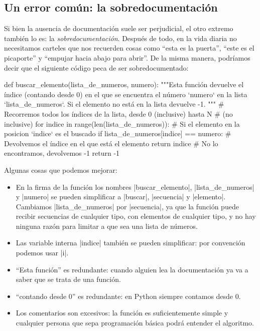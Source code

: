 \subsection{Un error común: la sobredocumentación}

Si bien la ausencia de documentación suele ser perjudicial, el otro extremo
también lo es: la \emph{sobredocumentación}. Después de todo, en la vida
diaria no necesitamos carteles que nos recuerden cosas como ``esta es la
puerta'', ``este es el picaporte'' y ``empujar hacia abajo para abrir''. De
la misma manera, podríamos decir que el siguiente código peca de ser sobredocumentado:

\begin{codigo-python-sn}
def buscar_elemento(lista_de_numeros, numero):
    """Esta función devuelve el índice (contando desde 0) en el que se
       encuentra el número `numero` en la lista `lista_de_numeros`.
       Si el elemento no está en la lista devuelve -1.
    """
    # Recorremos todos los índices de la lista, desde 0 (inclusive) hasta N
    # (no inclusive)
    for indice in range(len(lista_de_numeros)):
        # Si el elemento en la posicion `indice` es el buscado
        if lista_de_numeros[indice] == numero:
            # Devolvemos el índice en el que está el elemento
            return indice
    # No lo encontramos, devolvemos -1
    return -1
\end{codigo-python-sn}

Algunas cosas que podemos mejorar:

\begin{itemize}
\item En la firma de la función los nombres |buscar_elemento|,
    |lista_de_numeros| y |numero| se pueden simplificar a |buscar|, |secuencia| y
    |elemento|. Cambiamos |lista_de_numeros| por |secuencia|, ya que la función
    puede recibir secuencias de cualquier tipo, con elementos de cualquier
    tipo, y no hay ninguna razón para limitar a que sea una lista de números.
\item Las variable interna |indice| también se pueden simplificar:
    por convención podemos usar |i|.
\item ``Esta función'' es redundante: cuando alguien lea la documentación ya va
    a saber que se trata de una función.
\item ``contando desde 0'' es redundante: en Python siempre contamos desde 0.
\item Los comentarios son excesivos: la función es suficientemente simple y
    cualquier persona que sepa programación básica podrá entender el algoritmo.
\end{itemize}

